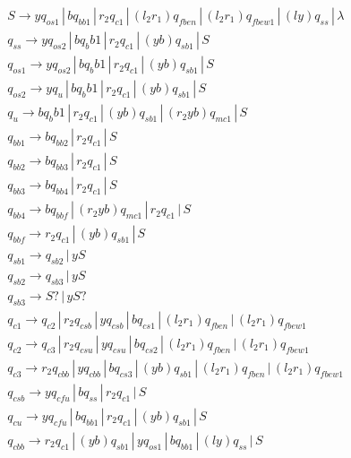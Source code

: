\documentclass{article}
\begin{document}
\begin{mylist}
\begin{align*}
&S \rightarrow yq_{os1} \, | \, bq_{bb1} \, | \, r_2q_{c1} \, | \, (l_2r_1)q_{fben} \, | \, (l_2r_1)q_{fbew1} \, | \, (ly)q_{ss} \, | \, \lambda \\
&q_{ss} \rightarrow yq_{os2} \, | \, b{q_bb1} \, | \, r_2q_{c1} \, | \, (yb)q_{sb1} \, | \, S\\
&q_{os1} \rightarrow yq_{os2} \, | \, b{q_bb1} \, | \, r_2q_{c1} \, | \, (yb)q_{sb1} \, | \, S\\
&q_{os2} \rightarrow yq_{u} \, | \, b{q_bb1} \, | \, r_2q_{c1} \, | \, (yb)q_{sb1} \, | \, S\\
&q_{u} \rightarrow b{q_bb1} \, | \, r_2q_{c1} \, | \,(yb)q_{sb1} \, | \, (r_2yb)q_{mc1} \, | \, S\\
&q_{bb1} \rightarrow bq_{bb2} \, | \, r_2q_{c1} \, | \, S \\ 
&q_{bb2} \rightarrow bq_{bb3} \, | \, r_2q_{c1} \, | \, S \\ 
&q_{bb3} \rightarrow bq_{bb4} \, | \, r_2q_{c1} \, | \, S \\ 
&q_{bb4} \rightarrow bq_{bbf} \, | \, (r_2yb)q_{mc1} \, | \, r_2q_{c1} \, | \, S \\ 
&q_{bbf} \rightarrow r_2q_{c1} \, | \, (yb)q_{sb1} \, | \, S \\ 
&q_{sb1} \rightarrow q_{sb2} \, | \, yS \\ 
&q_{sb2} \rightarrow q_{sb3} \, | \, yS \\ 
&q_{sb3} \rightarrow S? \, | \, yS? \\ 
&q_{c1} \rightarrow q_{c2} \, | \,  r_2q_{csb} \, | \, yq_{csb} \, | \, bq_{cs1} \, | \, (l_2r_1)q_{fben} \, | \, (l_2r_1)q_{fbew1}\\ 
&q_{c2} \rightarrow q_{c3} \, | \,  r_2q_{csu} \, | \, yq_{csu} \, | \, bq_{cs2} \, | \, (l_2r_1)q_{fben} \, | \, (l_2r_1)q_{fbew1}\\ 
&q_{c3} \rightarrow r_2q_{cbb} \, | \,  yq_{cbb} \, | \, bq_{cs3} \, | \, (yb)q_{sb1} \, | \, (l_2r_1)q_{fben} \, | \, (l_2r_1)q_{fbew1}\ \\ 
&q_{csb} \rightarrow yq_{cfu} \, | \,  bq_{ss} \, | \, r_2q_{c1} \, | \, S \\ 
&q_{cu} \rightarrow yq_{cfu} \, | \,  bq_{bb1} \, | \, r_2q_{c1} \, | \, (yb)q_{sb1} \, | \, S \\ 
&q_{cbb} \rightarrow r_2q_{c1} \, | \,  (yb)q_{sb1} \, | \, yq_{os1} \, | \, bq_{bb1} \, | \, (ly)q_{ss} \, | \, S \\ 

\end{align*}
\end{mylist}
\end{document}
